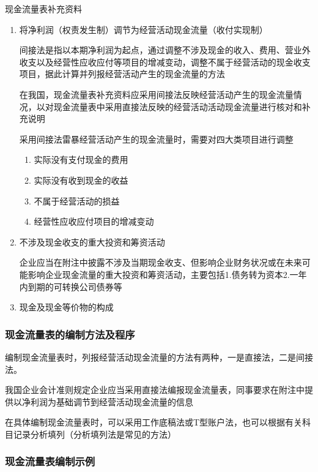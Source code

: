 \documentclass[UTF8,12pt]{ctexart}
\numberwithin{equation}{section} %
\numberwithin{figure}{section}
\numberwithin{table}{section}
\begin{document}
	现金流量表补充资料
	\begin{enumerate}
		\item 将净利润（权责发生制）调节为经营活动现金流量（收付实现制）
		
		间接法是指以本期净利润为起点，通过调整不涉及现金的收入、费用、营业外收支以及经营性应收应付等项目的增减变动，调整不属于经营活动的现金收支项目，据此计算并列报经营活动产生的现金流量的方法
		
		在我国，现金流量表补充资料应采用间接法反映经营活动产生的现金流量情况，以对现金流量表中采用直接法反映的经营活动活动现金流量进行核对和补充说明
		
		采用间接法雷暴经营活动产生的现金流量时，需要对四大类项目进行调整
		\begin{enumerate}
			\item 实际没有支付现金的费用
			
			\item 实际没有收到现金的收益
			
			\item 不属于经营活动的损益
			
			\item 经营性应收应付项目的增减变动
		\end{enumerate}
		
		\item 不涉及现金收支的重大投资和筹资活动
		
		企业应当在附注中披露不涉及当期现金收支、但影响企业财务状况或在未来可能影响企业现金流量的重大投资和筹资活动，主要包括1.债务转为资本2.一年内到期的可转换公司债券等
		
		\item 现金及现金等价物的构成
	\end{enumerate}
	\subsubsection{现金流量表的编制方法及程序}
	编制现金流量表时，列报经营活动现金流量的方法有两种，一是直接法，二是间接法。
	
	我国企业会计准则规定企业应当采用直接法编报现金流量表，同事要求在附注中提供以净利润为基础调节到经营活动现金流量的信息
	
	在具体编制现金流量表时，可以采用工作底稿法或T型账户法，也可以根据有关科目记录分析填列（分析填列法是常见的方法）
	
	\subsubsection{现金流量表编制示例}
	
\end{document}
